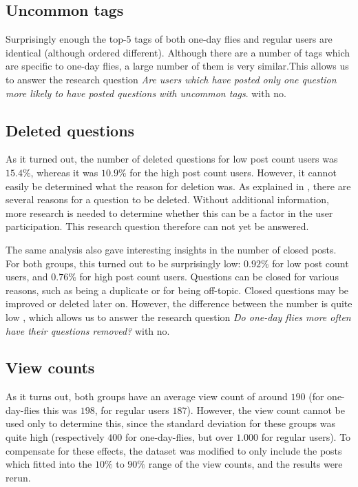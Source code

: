 \documentclass[conference]{IEEEtran}
\begin{document}
\subsection{Uncommon tags}

Surprisingly enough the top-5 tags of both one-day flies and regular users are
identical (although ordered different). Although there are a number of tags
which are specific to one-day flies, a large number of them is very
similar.This allows us to answer the research question \textit{Are users which
have posted only one question more likely to have posted questions with
uncommon tags}. with no.

\subsection{Deleted questions}
As it turned out, the number of deleted questions for low post count users was
$15.4\%$, whereas it was $10.9\%$ for the high post count users. However, it
cannot easily be determined what the reason for deletion was. As explained in
\cite{correa2014chaff}, there are several reasons for a question to be deleted.
Without additional information, more research is needed to determine whether
this can be a factor in the user participation. This research question
therefore can not yet be answered.

The same analysis also gave interesting insights in the number of closed posts.
For both groups, this turned out to be surprisingly low: $0.92\%$ for low post
count users, and $0.76\%$ for high post count users. Questions can be closed
for various reasons, such as being a duplicate or for being off-topic. Closed
questions may be improved or deleted later on. However, the difference between
the number is quite low , which allows us to answer the research question
\textit{Do one-day flies more often have their questions removed?} with no.

\subsection{View counts}
As it turns out, both groups have an average view count of around $190$ (for
one-day-flies this was $198$, for regular users $187$). However, the view count
cannot be used only to determine this, since the standard deviation for these
groups was quite high (respectively $400$ for one-day-flies, but over $1.000$
for regular users). To compensate for these effects, the dataset was modified
to only include the posts which fitted into the $10\%$ to $90\%$ range of the
view counts, and the results were rerun.
\end{document}
